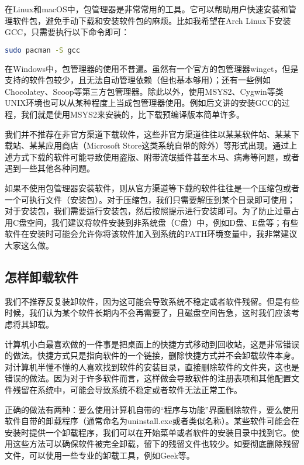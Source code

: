 在Linux和macOS中，包管理器是非常常用的工具。它可以帮助用户快速安装和管理软件包，避免手动下载和安装软件包的麻烦。比如我希望在Arch Linux下安装GCC，只需要执行以下命令即可：

\begin{lstlisting}[language=bash]
    sudo pacman -S gcc
\end{lstlisting}

在Windows中，包管理器的使用不普遍。虽然有一个官方的包管理器winget，但是支持的软件包较少，且无法自动管理依赖（但也基本够用）；还有一些例如Chocolatey、Scoop等第三方包管理器。除此以外，使用MSYS2、Cygwin等类UNIX环境也可以从某种程度上当成包管理器使用。例如后文讲的安装GCC的过程，我们就是使用MSYS2来安装的，比下载预编译版本简单许多。

我们并不推荐在非官方渠道下载软件，这些非官方渠道往往以某某软件站、某某下载站、某某应用商店（Microsoft Store这类系统自带的除外）等形式出现。通过上述方式下载的软件可能导致使用盗版、附带流氓插件甚至木马、病毒等问题，或者遇到一些其他各种问题。

如果不使用包管理器安装软件，则从官方渠道等下载的软件往往是一个压缩包或者一个可执行文件（安装包）。对于压缩包，我们只需要解压到某个目录即可使用；对于安装包，我们需要运行安装包，然后按照提示进行安装即可。为了防止过量占用C盘空间，我们建议将软件安装到非系统盘（C盘）中，例如D盘、E盘等；有些软件在安装时可能会允许你将该软件加入到系统的PATH环境变量中，我非常建议大家这么做。

\subsection{怎样卸载软件}

我们不推荐反复装卸软件，因为这可能会导致系统不稳定或者软件残留。但是有些时候，我们认为某个软件长期内不会再需要了，且磁盘空间告急，这时我们应该考虑将其卸载。

计算机小白最喜欢做的一件事是把桌面上的快捷方式移动到回收站，这是非常错误的做法。快捷方式只是指向软件的一个链接，删除快捷方式并不会卸载软件本身。对计算机半懂不懂的人喜欢找到软件的安装目录，直接删除软件的文件夹，这也是错误的做法。因为对于许多软件而言，这样做会导致软件的注册表项和其他配置文件残留在系统中，可能会导致系统不稳定或者软件无法正常工作。

正确的做法有两种：要么使用计算机自带的“程序与功能”界面删除软件，要么使用软件自带的卸载程序（通常命名为uninstall.exe或者类似名称）。某些软件可能会在安装时提供一个卸载程序，我们可以在开始菜单或者软件的安装目录中找到它。使用这些方法可以确保软件被完全卸载，留下的残留文件也较少。如要彻底删除残留文件，可以使用一些专业的卸载工具，例如Geek等。

